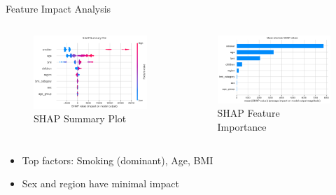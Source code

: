 \documentclass[10pt]{beamer}
\begin{document}
\begin{frame}{Feature Impact Analysis}
\begin{columns}
\begin{column}{0.5\textwidth}
\begin{figure}
\includegraphics[width=\textwidth]{shap_summary.png}
\caption{SHAP Summary Plot}
\end{figure}
\end{column}
\begin{column}{0.5\textwidth}
\begin{figure}
\includegraphics[width=\textwidth]{shap_bar.png}
\caption{SHAP Feature Importance}
\end{figure}
\end{column}
\end{columns}
\begin{itemize}
\item Top factors: Smoking (dominant), Age, BMI
\item Sex and region have minimal impact
\end{itemize}
\end{frame}
\end{document}
